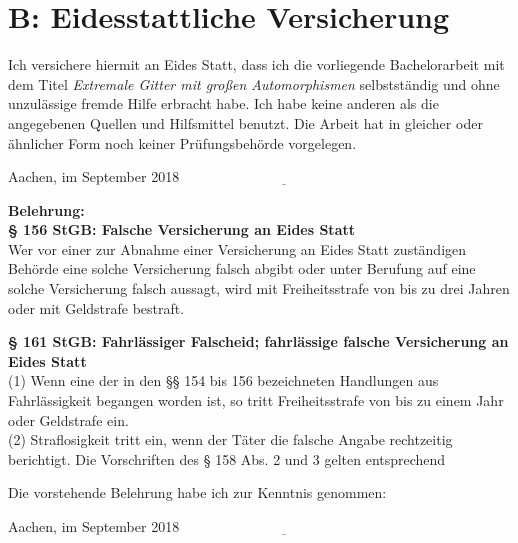 \documentclass[12pt,a4paper,halfparskip,headsepline, bibtotocnumbered]{scrreprt}
\theoremstyle{nummermitklammern}
\theoremstyle{nonumberbreak}
\begin{document}
\section{B: Eidesstattliche Versicherung}
Ich versichere hiermit an Eides Statt, dass ich die vorliegende Bachelorarbeit mit dem Titel
\textit{Extremale Gitter mit großen Automorphismen} selbstständig und ohne unzulässige fremde Hilfe erbracht habe.
Ich habe keine anderen als die angegebenen Quellen und Hilfsmittel benutzt. Die Arbeit hat in gleicher oder
ähnlicher Form noch keiner Prüfungsbehörde vorgelegen.\par
\vspace{0.5cm}
Aachen, im September 2018 \hfill $\underline{\hspace{6cm}}$\par
\vspace{2cm}
\begin{small}
\textbf{Belehrung:}\\
\textbf{§ 156 StGB: Falsche Versicherung an Eides Statt}\\
Wer vor einer zur Abnahme einer Versicherung an Eides Statt zuständigen Behörde eine solche Versicherung
falsch abgibt oder unter Berufung auf eine solche Versicherung falsch aussagt, wird mit Freiheitsstrafe
von bis zu drei Jahren oder mit Geldstrafe bestraft.\par
\textbf{§ 161 StGB: Fahrlässiger Falscheid; fahrlässige falsche Versicherung an Eides Statt}\\
(1) Wenn eine der in den §§ 154 bis 156 bezeichneten Handlungen aus Fahrlässigkeit begangen worden ist, so
tritt Freiheitsstrafe von bis zu einem Jahr oder Geldstrafe ein.\\
(2) Straflosigkeit tritt ein, wenn der Täter die falsche Angabe rechtzeitig berichtigt. Die
Vorschriften des § 158 Abs. 2 und 3 gelten entsprechend\par
\end{small}
Die vorstehende Belehrung habe ich zur Kenntnis genommen:\par
\vspace{0.5cm}
Aachen, im September 2018 \hfill $\underline{\hspace{6cm}}$\\


\end{document}
